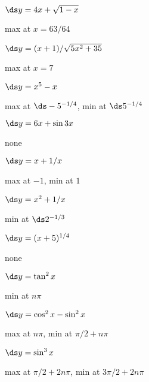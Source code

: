 \begin{enumialphparenastyle}
\begin{ex}
 $\ds y = 4x+\sqrt{1-x}$
\begin{sol}
 max at $x=63/64$
\end{sol}
\end{ex}

\begin{ex}
 $\ds y = (x+1)/\sqrt{5x^2 + 35}$
\begin{sol}
 max at $x=7$
\end{sol}
\end{ex}

\begin{ex}
 $\ds y= x^5 - x$
\begin{sol}
 max at $\ds -5^{-1/4}$, min at $\ds 5^{-1/4}$
\end{sol}
\end{ex}

\begin{ex}
 $\ds y = 6x +\sin 3x$
\begin{sol}
 none
\end{sol}
\end{ex}

\begin{ex}
 $\ds y = x+ 1/x$
\begin{sol}
 max at $-1$, min at $1$
\end{sol}
\end{ex}

\begin{ex}
 $\ds y = x^2+ 1/x$
\begin{sol}
 min at $\ds 2^{-1/3}$
\end{sol}
\end{ex}

\begin{ex}
 $\ds y = (x+5)^{1/4}$
\begin{sol}
 none
\end{sol}
\end{ex}

\begin{ex}
 $\ds y = \tan^2 x$
\begin{sol}
 min at $n\pi$
\end{sol}
\end{ex}

\begin{ex}
 $\ds y =\cos^2 x - \sin^2 x$
\begin{sol}
 max at $n\pi$, min at $\pi/2+n\pi$
\end{sol}
\end{ex}

\begin{ex}
 $\ds y = \sin^3 x$
\begin{sol}
 max at $\pi/2+2n\pi$, min at $3\pi/2+2n\pi$
\end{sol}
\end{ex}

\end{enumialphparenastyle}